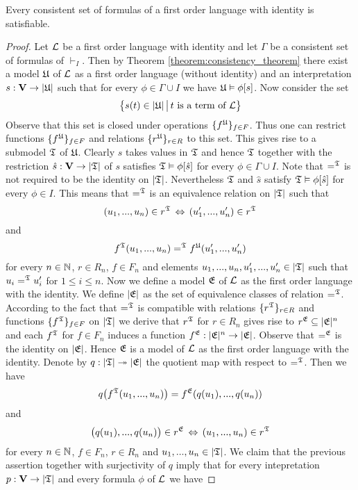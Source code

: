 \documentclass[10pt]{amsart}
\begin{document}
\begin{theorem}\label{theorem:consistency_theorem_for_languages_with_identity}
	Every consistent set of formulas of a first order language with identity is satisfiable.
\end{theorem}
\begin{proof}
	Let ${\mathcal L}$ be a first order language with identity and let $\Gamma$ be a consistent set of formulas of $\vdash_I$. Then by Theorem \ref{theorem:consistency_theorem} there exist a model ${\mathfrak U}$ of ${\mathcal L}$ as a first order language (without identity) and an interpretation $s:\mathbf{V}\rightarrow |{\mathfrak U}|$ such that for every $\phi \in \Gamma\cup I$ we have ${\mathfrak U}\vDash \phi[s]$. Now consider the set
	$$\big\{s(t)\in |{\mathfrak U}|\,\big|\,\mbox{$t$ is a term of ${\mathcal L}$}\big\}$$
	Observe that this set is closed under operations $\{f^{\mathfrak U}\}_{f\in F}$. Thus one can restrict functions $\{f^{\mathfrak U}\}_{f\in F}$ and relations $\{r^{{\mathfrak U}}\}_{r\in R}$ to this set. This gives rise to a submodel ${\mathfrak T}$ of ${\mathfrak U}$. Clearly $s$ takes values in ${\mathfrak T}$ and hence ${\mathfrak T}$ together with the restriction $\hat{s}:\mathbf{V}\rightarrow |{\mathfrak T}|$ of $s$ satisfies ${\mathfrak T} \vDash \phi[\hat{s}]$ for every $\phi \in \Gamma \cup I$. Note that $=^{\mathfrak T}$ is not required to be the identity on $|{\mathfrak T}|$. Nevertheless ${\mathfrak T}$ and $\hat{s}$ satisfy ${\mathfrak T} \vDash \phi[\hat{s}]$ for every $\phi \in I$. This means that $=^{\mathfrak T}$ is an equivalence relation on $|{\mathfrak T}|$ such that
	$$(u_1,...,u_n)\in r^{{\mathfrak T}}\,\Leftrightarrow\,(u'_1,...,u'_n)\in r^{{\mathfrak T}}$$
	and
	$$f^{{\mathfrak T}}(u_1,...,u_n) =^{{\mathfrak T}} f^{{\mathfrak U}}(u'_1,...,u'_n)$$
	for every $n\in {\mathbb N}$, $r\in R_n$, $f\in F_n$ and elements $u_1,...,u_n,u'_1,...,u'_n \in |{\mathfrak T}|$ such that $u_i =^{{\mathfrak T}} u'_i$ for $1\leq i\leq n$. Now we define a model ${\mathfrak E}$ of ${\mathcal L}$ as the first order language with the identity. We define $|{\mathfrak E}|$ as the set of equivalence classes of relation $=^{{\mathfrak T}}$. According to the fact that $=^{{\mathfrak T}}$ is compatible with relations $\{r^{{\mathfrak T}}\}_{r\in R}$ and functions $\{f^{{\mathfrak T}}\}_{f\in F}$ on $|{\mathfrak T}|$ we derive that $r^{\mathfrak T}$ for $r\in R_n$ gives rise to $r^{\mathfrak E}\subseteq |{\mathfrak E}|^n$ and each $f^{{\mathfrak T}}$ for $f\in F_n$ induces a function $f^{\mathfrak E}:|{\mathfrak E}|^n\rightarrow |{\mathfrak E}|$. Observe that $=^{\mathfrak E}$ is the identity on $|{\mathfrak E}|$. Hence ${\mathfrak E}$ is a model of ${\mathcal L}$ as the first order language with the identity. Denote by $q:|{\mathfrak T}|\twoheadrightarrow |{\mathfrak E}|$ the quotient map with respect to $=^{{\mathfrak T}}$. Then we have
	$$q\big(f^{{\mathfrak T}}(u_1,...,u_n)\big) = f^{{\mathfrak E}}(q(u_1),...,q(u_n))$$
	and
	$$\big(q(u_1),...,q(u_n)\big)\in r^{{\mathfrak E}}\,\Leftrightarrow\,(u_1,...,u_n)\in r^{{\mathfrak T}}$$
	for every $n\in {\mathbb N}$, $f\in F_n$, $r\in R_n$ and $u_1,...,u_n\in |{\mathfrak T}|$. We claim that the previous assertion together with surjectivity of $q$ imply that for every intepretation $p:\mathbf{V}\rightarrow |{\mathfrak T}|$ and every formula $\phi$ of ${\mathcal L}$ we have

\end{proof}
\end{document}
